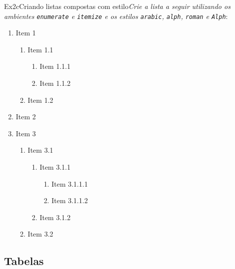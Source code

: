 \begin{texercise}{Ex2c}{Criando listas compostas com estilo}\textit{Crie a lista a seguir utilizando os ambientes \texttt{enumerate} e \texttt{itemize} e os estilos  {\tt arabic}, {\tt alph}, {\tt roman} e {\tt Alph}}:\par\smallskip%
\begin{tcboutputlisting}
\renewcommand{\labelenumi}{\arabic{enumi}}
\renewcommand{\labelenumii}{\alph{enumii}}
\renewcommand{\labelenumiii}{\roman{enumiii}}
\renewcommand{\labelenumiv}{\Alph{enumiv}}
\begin{enumerate}
    \item Item 1
    \begin{enumerate}
        \item Item 1.1
        \begin{enumerate}
            \item Item 1.1.1
            \item Item 1.1.2
        \end{enumerate}
        \item Item 1.2
    \end{enumerate}
    \item Item 2
    \item Item 3
    \begin{enumerate}
        \item Item 3.1
         \begin{enumerate}
            \item Item 3.1.1
            \begin{enumerate}
                \item Item 3.1.1.1
                \item Item 3.1.1.2
            \end{enumerate}
            \item Item 3.1.2
        \end{enumerate}
        \item Item 3.2
    \end{enumerate}
\end{enumerate}
\end{tcboutputlisting}
\tcbuselistingtext%
\end{texercise}

\subsection*{Tabelas}
\label{sec:exec_tabelas}

